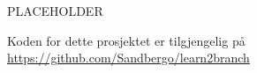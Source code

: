 \chapter*{\norwegianabstractname}
%
PLACEHOLDER

Koden for dette prosjektet er tilgjengelig på\\ \url{https://github.com/Sandbergo/learn2branch}
\clearpage
